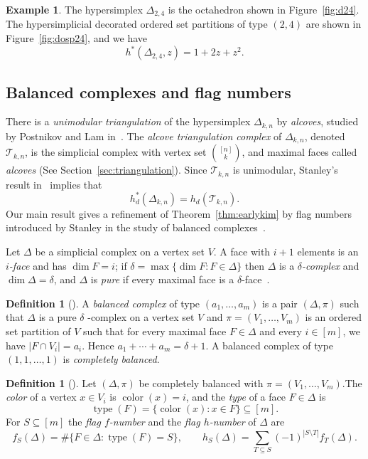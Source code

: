 \documentclass[10pt,a4paper]{amsart}
\theoremstyle{plain}
\theoremstyle{definition}
\newtheorem{definition}[theorem]{Definition}
\newtheorem{example}[theorem]{Example}
\newcommand{\hyp}{\Delta_{k,n}}
\newcommand{\Tri}{\mathcal{T}_{k,n}}
\DeclareMathOperator{\typ}{type}
\DeclareMathOperator{\col}{color}
\begin{document}
\begin{example}\label{ex:d24}
	The hypersimplex $ \Delta_{2,4} $
	is the octahedron shown in Figure~\ref{fig:d24}.
	The hypersimplicial decorated ordered set partitions of type $ (2,4) $
	are shown in Figure~\ref{fig:dosp24}, and we have
	\[
		h^*(\Delta_{2,4},z) = 1 + 2z + z^2.
	\]
\end{example}

\subsection{Balanced complexes and flag numbers}\label{ss:balanced-flag}
There is a \emph{unimodular triangulation} of the hypersimplex $\hyp$ by \emph{alcoves}, studied by Postnikov and Lam
in~\cite{alcove1}. The \emph{alcove triangulation complex} of $\hyp$, denoted $\Tri$, is the simplicial complex with
vertex set $\binom{[n]}{k}$, and maximal faces called \emph{alcoves} (See Section~\ref{sec:triangulation}). Since
$\Tri$ is unimodular, Stanley's result in~\cite{stanley80} implies that \[h^*_d(\hyp) = h_d(\Tri).\] Our main result gives a refinement of Theorem~\ref{thm:earlykim} by flag numbers introduced by Stanley in the study
   of balanced complexes~\cite{Stanley1979}.

Let $\Delta $ be a simplicial complex on a vertex set $ V $. A face with $ i+1 $ elements is an \emph{ $ i $-face} and
has $ \dim F=i $; if $ \delta=\max\{\dim F:F\in\Delta\} $ then $ \Delta $ is a \emph{$ \delta $-complex} and $
\dim\Delta=\delta $, and $ \Delta $ is \emph{pure} if every maximal face is a $ \delta $-face~\cite[\S1]{Stanley1979}.

\begin{definition}[{\cite[\S2]{Stanley1979}}]\label{def:balanced}
	A \emph{balanced complex} of type $ (a_1,\dots,a_m) $ is a pair $ (\Delta,\pi) $ such that $ \Delta $ is a pure $ \delta $
	-complex on a vertex set $ V $ and $\pi=(V_1,\ldots, V_m)$ is an ordered set partition of $ V $
	such that for every maximal face $ F\in\Delta $ and every $ i\in[m] $, we have $ |F\cap V_i|=a_i $. Hence $
		a_1+\cdots+a_m=\delta+1 $.
	A balanced complex of type $ (1,1,\dots,1) $
	is \emph{completely balanced}.
\end{definition}

\begin{definition}[{\cite[\S3]{Stanley1979}}]\label{def:flag}
	Let $ (\Delta,\pi) $
	be completely balanced with $\pi = (V_1, \ldots,V_m)$.The \emph{color} of a vertex $ x\in V_i $ is $ \col(x)=i $, and the \emph{type} of a face $ F\in\Delta $ is
	\begin{equation}
		\typ(F)=\{\col(x):x\in F\}\subseteq[m].
	\end{equation}
	For $ S\subseteq[m] $ the \emph{flag $ f $-number} and the \emph{flag $ h $-number} of $ \Delta $ are
	\begin{equation}\label{eq:flagnumbers}
		f_S(\Delta)=\#\{F\in\Delta:\typ(F)=S\},\qquad
		h_S(\Delta)=\sum_{T\subseteq S}(-1)^{|S\setminus T|}f_T(\Delta).
	\end{equation}
\end{definition}
\end{document}
